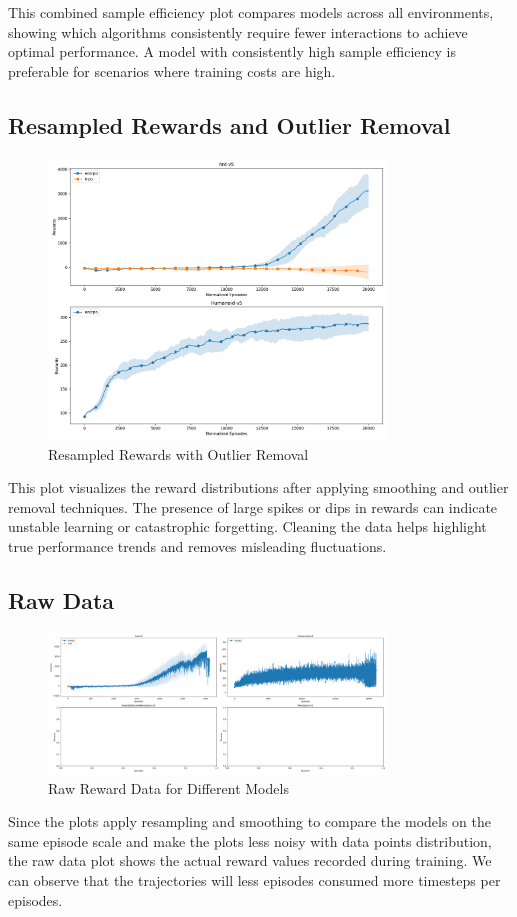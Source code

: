 \documentclass{article}
\begin{document}
This combined sample efficiency plot compares models across all environments, showing which algorithms consistently require fewer interactions to achieve optimal performance. A model with consistently high sample efficiency is preferable for scenarios where training costs are high.

\subsection*{Resampled Rewards and Outlier Removal}

\begin{figure}[H]
    \centering
    \includegraphics[width=0.8\textwidth]{.assets/resampled_outlier.png}
    \caption{Resampled Rewards with Outlier Removal}
\end{figure}

This plot visualizes the reward distributions after applying smoothing and outlier removal techniques. The presence of large spikes or dips in rewards can indicate unstable learning or catastrophic forgetting. Cleaning the data helps highlight true performance trends and removes misleading fluctuations.

\subsection*{Raw Data}
\begin{figure}[H]
    \centering
    \includegraphics[width=0.8\textwidth]{.assets/raw_data.png}
    \caption{Raw Reward Data for Different Models}
\end{figure}

Since the plots apply resampling and smoothing to compare the models on the same episode scale and make the plots less noisy with data points distribution, the raw data plot shows the actual reward values recorded during training. We can observe that the trajectories will less episodes consumed more timesteps per episodes.
\end{document}
